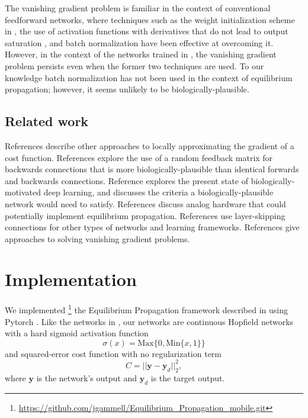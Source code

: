 \documentclass[utf8]{frontiersSCNS}
\newcommand{\mtx}[1]{\bm{#1}}
\begin{document}
The vanishing gradient problem is familiar in the context of conventional feedforward networks, where techniques such as the weight initialization scheme in \citep{glorot2010}, the use of activation functions with derivatives that do not lead to output saturation \citep{schmidhuber2015}, and batch normalization \citep{ioffe2015} have been effective at overcoming it. However, in the context of the networks trained in \citep{scellier17}, the vanishing gradient problem persists even when the former two techniques are used. To our knowledge batch normalization has not been used in the context of equilibrium propagation; however, it seems unlikely to be biologically-plausible.

\subsection{Related work}

References \citep{lee2015, xie2003, pineda1987} describe other approaches to locally approximating the gradient of a cost function. References \citep{lillicrap2014, crafton2019} explore the use of a random feedback matrix for backwards connections that is more biologically-plausible than identical forwards and backwards connections. Reference \citep{bartunov2018} explores the present state of biologically-motivated deep learning, and \citep{bengio2015} discusses the criteria a biologically-plausible network would need to satisfy. References \citep{shainline2019, davies2018, nahmias2013} discuss analog hardware that could potentially implement equilibrium propagation. References \citep{he2015, srivastava2015, xiaohu2011, krishnan2019} use layer-skipping connections for other types of networks and learning frameworks. References \citep{ioffe2015, glorot2010} give approaches to solving vanishing gradient problems.

\section{Implementation}
\label{sec:implementation}

We implemented \footnote{\url{https://github.com/jgammell/Equilibrium_Propagation_mobile.git}} the Equilibrium Propagation framework described in \citep{scellier17} using Pytorch \citep{pytorch2019}. Like the networks in \citep{scellier17}, our networks are continuous Hopfield networks with a hard sigmoid activation function $$\sigma(x)=\text{Max}\{0, \text{Min}\{x, 1\}\}$$ and squared-error cost function with no regularization term $$C=||\mtx{y}-\mtx{y}_d||_2^2,$$ where $\mtx{y}$ is the network's output and $\mtx{y}_d$ is the target output.
\end{document}
